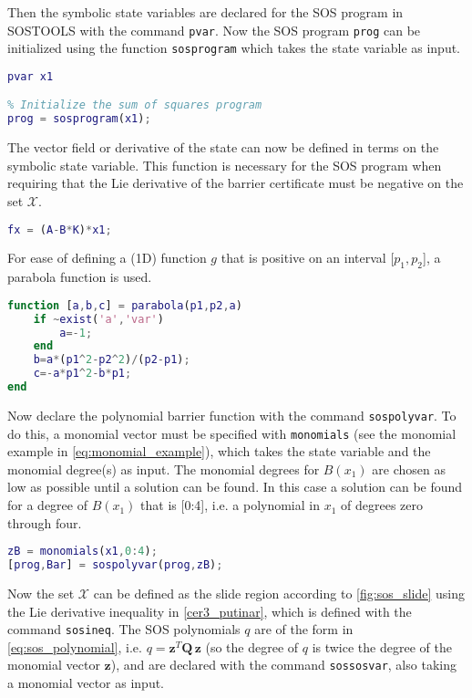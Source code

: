 Then the symbolic state variables are declared for the SOS program in SOSTOOLS with the command \texttt{pvar}. %
Now the SOS program \texttt{prog} can be initialized using the function \texttt{sosprogram} which takes the state variable as input. 
\begin{lstlisting}[language=matlab]
% Declare state variables
pvar x1

% Initialize the sum of squares program
prog = sosprogram(x1);
\end{lstlisting}
The vector field or derivative of the state can now be defined in terms on the symbolic state variable. This function is necessary for the SOS program when requiring that the Lie derivative of the barrier certificate must be negative on the set $\mathcal{X}$.
\begin{lstlisting}[language=matlab]
% Vector field dx/dt = fx (closed loop)
fx = (A-B*K)*x1;
\end{lstlisting}
For ease of defining a (1D) function $g$ that is positive on an interval [$p_1, p_2$], a parabola function is used.
\begin{lstlisting}[language=matlab]
function [a,b,c] = parabola(p1,p2,a)
	if ~exist('a','var')
		a=-1;
	end
	b=a*(p1^2-p2^2)/(p2-p1);
	c=-a*p1^2-b*p1;
end
\end{lstlisting}
Now declare the polynomial barrier function with the command \texttt{sospolyvar}. To do this, a monomial vector must be specified with \texttt{monomials} (see the monomial example in \autoref{eq:monomial_example}), which takes the state variable and the monomial degree(s) as input. The monomial degrees for $B(x_1)$ are chosen as low as possible until a solution can be found. In this case a solution can be found for a degree of $B(x_1)$ that is [0:4], i.e. a polynomial in $x_1$ of degrees zero through four.
\begin{lstlisting}[language=matlab]
% Declare the polynomial barrier function
zB = monomials(x1,0:4);
[prog,Bar] = sospolyvar(prog,zB);
\end{lstlisting}
Now the set $\mathcal{X}$ can be defined as the slide region according to \autoref{fig:sos_slide} using the Lie derivative inequality in \autoref{cer3_putinar}, which is defined with the command \texttt{sosineq}. The SOS polynomials $q$ are of the form in \autoref{eq:sos_polynomial}, i.e. $q=\mathbf{z}^T\mathbf{Q}\,\mathbf{z}$ (so the degree of $q$ is twice the degree of the monomial vector $\mathbf{z}$), and are declared with the command \texttt{sossosvar}, also taking a monomial vector as input.

